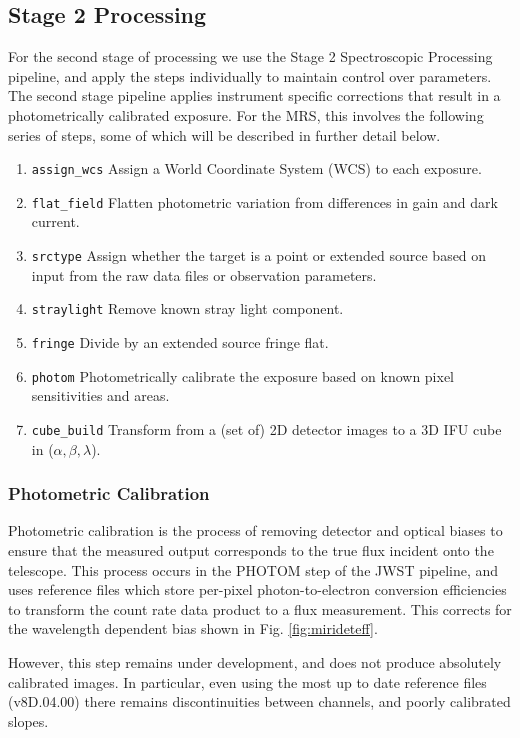 \subsection{Stage 2 Processing}
For the second stage of processing we use the Stage 2 Spectroscopic Processing pipeline, and apply the steps individually to maintain control over parameters.
The second stage pipeline applies instrument specific corrections that result in a photometrically calibrated exposure. For the MRS, this involves the following series of steps, some of which will be described in further detail below.
\begin{enumerate}
	\item \verb|assign_wcs| Assign a World Coordinate System (WCS) to each exposure.
	\item \verb|flat_field| Flatten photometric variation from differences in gain and dark current.
	\item \verb|srctype| Assign whether the target is a point or extended source based on input from the raw data files or observation parameters.
	\item \verb|straylight| Remove known stray light component.
	\item \verb|fringe| Divide by an extended source fringe flat.
	\item \verb|photom| Photometrically calibrate the exposure based on known pixel sensitivities and areas.
	\item \verb|cube_build| Transform from a (set of) 2D detector images to a 3D IFU cube in ($\alpha,\beta,\lambda$).
\end{enumerate} 
\subsubsection{Photometric Calibration}
Photometric calibration is the process of removing detector and optical biases to ensure that the measured output corresponds to the true flux incident onto the telescope.
This process occurs in the PHOTOM step of the JWST pipeline, and uses reference files which store per-pixel photon-to-electron conversion efficiencies to transform the count rate data product to a flux measurement.
This corrects for the wavelength dependent bias shown in Fig. \ref{fig:mirideteff}.

However, this step remains under development, and does not produce absolutely calibrated images. In particular, even using the most up to date reference files (v8D.04.00) there remains discontinuities between channels, and poorly calibrated slopes.
